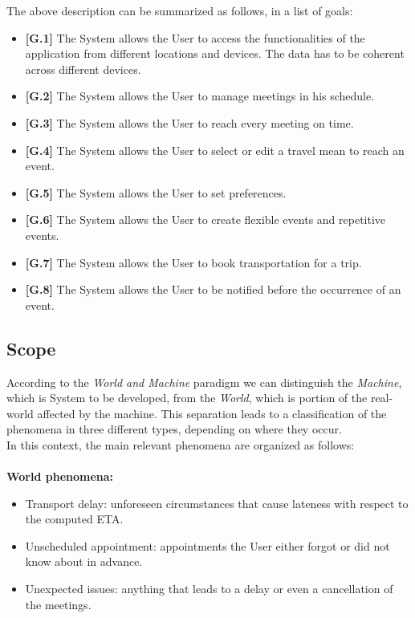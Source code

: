 \noindent
The above description can be summarized as follows, in a list of goals:
\begin{itemize}
	\item \textbf{[G.1]} The System allows the User to access the functionalities of the application from different locations and devices. The data has to be coherent across different devices.
	\item \textbf{[G.2]} The System allows the User to manage meetings in his schedule.
	\item \textbf{[G.3]} The System allows the User to reach every meeting on time.
	\item \textbf{[G.4]} The System allows the User to select or edit a travel mean to reach an event.
	\item \textbf{[G.5]} The System allows the User to set preferences.
	\item \textbf{[G.6]} The System allows the User to create flexible events and repetitive events.
	\item \textbf{[G.7]} The System allows the User to book transportation for a trip.
	\item \textbf{[G.8]} The System allows the User to be notified before the occurrence of an event.
\end{itemize}


\subsection{Scope}
According to the \textit{World and Machine} paradigm we can distinguish the \textit{Machine}, which is System to be developed, from the \textit{World}, which is portion of the real-world affected by the machine. This separation leads to a classification of the phenomena in three different types, depending on where they occur.\\
In this context, the main relevant phenomena are organized as follows: \\ \\
\noindent
\textbf{World phenomena:}
\begin{itemize}
	\item Transport delay: unforeseen circumstances that cause lateness with respect to the computed ETA.
	\item Unscheduled appointment: appointments the User either forgot or did not know about in advance.
	\item Unexpected issues: anything that leads to a delay or even a cancellation of the meetings.
\end{itemize}


